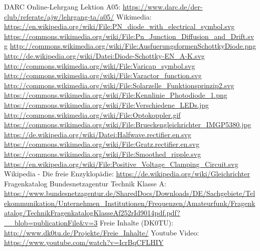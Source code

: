 \begin{thebibliography}{}
    DARC Online-Lehrgang Lektion A05:
    \url{https://www.darc.de/der-club/referate/ajw/lehrgang-ta/a05/}
    Wikimedia:
    \url{https://en.wikipedia.org/wiki/File:PN_diode_with_electrical_symbol.svg}
    \url{https://commons.wikimedia.org/wiki/File:Pn_Junction_Diffusion_and_Drift.svg}
    \url{http://commons.wikimedia.org/wiki/File:AusfuerungsformenSchottkyDiode.png}
    \url{http://de.wikipedia.org/wiki/Datei:Diode-Schottky-EN_A-K.svg}
    \url{http://commons.wikimedia.org/wiki/File:Varicap_symbol.svg}
    \url{http://commons.wikimedia.org/wiki/File:Varactor_function.svg}
    \url{http://commons.wikimedia.org/wiki/File:Solarzelle_Funktionsprinzip2.svg}
    \url{https://commons.wikimedia.org/wiki/File:Kennlinie_Photodiode_1.png}
    \url{https://commons.wikimedia.org/wiki/File:Verschiedene_LEDs.jpg}
    \url{http://commons.wikimedia.org/wiki/File:Optokoppler.gif}
    \url{https://commons.wikimedia.org/wiki/File:Brueckengleichrichter_IMGP5380.jpg}
    \url{https://de.wikipedia.org/wiki/Datei:Halfwave.rectifier.en.svg}
    \url{https://commons.wikimedia.org/wiki/File:Gratz.rectifier.en.svg}
    \url{https://commons.wikimedia.org/wiki/File:Smoothed_ripple.svg}
    \url{https://en.wikipedia.org/wiki/File:Positive_Voltage_Clamping_Circuit.svg}
    \url{}
    \url{}
      Wikipedia - Die freie Enzyklopädie:
    \url{https://de.wikipedia.org/wiki/Gleichrichter}
     Fragenkatalog Bundesnetzagentur Technik Klasse A:
    \url{https://www.bundesnetzagentur.de/SharedDocs/Downloads/DE/Sachgebiete/Telekommunikation/Unternehmen_Institutionen/Frequenzen/Amateurfunk/Fragenkatalog/TechnikFragenkatalogKlasseAf252rId9014pdf.pdf?__blob=publicationFile&v=3}
      Freie Inhalte (DK0TU):
    \url{http://www.dk0tu.de/Projekte/Freie_Inhalte/}
      Youtube Video:
    \url{https://www.youtube.com/watch?v=IcrBqCFLHIY}
\end{thebibliography}


